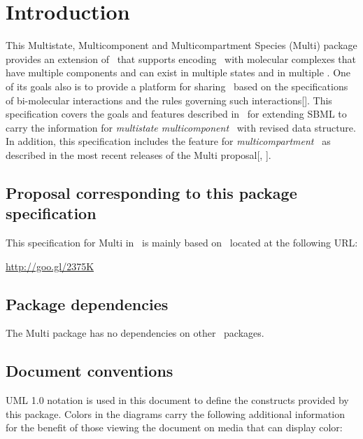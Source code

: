 
\section{Introduction}
\label{def:Introduction}

This Multistate, Multicomponent and Multicompartment Species (Multi) package provides an extension of \SbmlLevelThreeWC\ that supports encoding \smodels\ with molecular complexes that have multiple components and can exist in multiple states and in multiple \compartments. One of its goals also is to provide a platform for sharing \smodels\ based on the specifications of bi-molecular interactions and the rules governing such interactions[\cite{ref:simmune2012, ref:scienceSignaling2006, ref:FeretPnas2009, ref:modeler2013}]. This specification covers the goals and features described in \multiOneProposalWC\ for extending SBML to carry the information for \textit{multistate multicomponent} \species\ with revised data structure. In addition, this specification includes the feature for \textit{multicompartment} \species\ as described in the most recent releases of the Multi proposal[\cite{ref:multiproposal280}, \cite{ref:revisedMulti}].

\subsection{Proposal corresponding to this package specification}
\label{def:Proposal}

This specification for Multi in \SbmlLevelThreeVersionOne\ is mainly based on \multiTwoProposalVerThreeTwo\ located at
the following URL:

\hspace{4ex} \url{http://goo.gl/2375K}

\subsection{Package dependencies}
\label{def:Package_dependencies}

The Multi package has no dependencies on other \SbmlLevelThree\ packages.

\subsection{Document conventions}
\label{def:Document_conventions}

UML 1.0 notation is used in this document to define the constructs provided by this package. Colors 
in the diagrams carry the following additional information for the benefit of those viewing the 
document on media that can display color:

